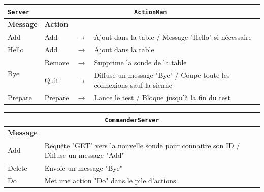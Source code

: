 \documentclass[a4paper,11pt]{article}
\newcommand{\cd}[1]{\texttt{#1}}
\begin{document}
\begin{center}
\begin{tabular}{|l|l|c|l|}
\hline
\cd{Server} & \multicolumn{3}{|c|}{\cd{ActionMan}} \\
\hline
\textbf{Message} & \textbf{Action} & & \\
\hline
Add & Add & $\longrightarrow$ & Ajout dans la table / Message "Hello" si nécessaire\\
\hline
Hello & Add & $\longrightarrow$ & Ajout dans la table\\
\hline
\multirow{2}{*}{Bye} & Remove & $\longrightarrow$ & Supprime la sonde de la table\\
\cline{2-4}
 & Quit & $\longrightarrow$ & Diffuse un message "Bye" / Coupe toute les connexions sauf la sienne\\
\hline
Prepare & Prepare & $\longrightarrow$ & Lance le test / Bloque jusqu'à la fin du test \\
\hline
\end{tabular}
\end{center}

\begin{center}
\begin{tabular}{|l|l|}
\hline
\multicolumn{2}{|c|}{\cd{CommanderServer}} \\
\hline
\textbf{Message} & \\
\hline
Add & Requête "GET" vers la nouvelle sonde pour connaitre son ID / Diffuse un message "Add" \\
\hline
Delete & Envoie un message "Bye"\\
\hline
Do & Met une action "Do" dans le pile d'actions\\
\hline
\end{tabular}
\end{center}
\end{document}
